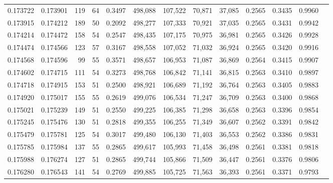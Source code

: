 \begin{tabular}{rrrrrrrrrrrrr}
0.173722 & 0.173901 &   119 &  64 &                                     0.3497 & 498,088 & 107,522 &  70,871 &  37,085 & 0.2565 & 0.3435 & 0.9960 \\
0.173915 & 0.174212 &   189 &  50 &                                     0.2092 & 498,277 & 107,333 &  70,921 &  37,035 & 0.2565 & 0.3431 & 0.9942 \\
0.174214 & 0.174472 &   158 &  54 &                                     0.2547 & 498,435 & 107,175 &  70,975 &  36,981 & 0.2565 & 0.3426 & 0.9928 \\
0.174474 & 0.174566 &   123 &  57 &                                     0.3167 & 498,558 & 107,052 &  71,032 &  36,924 & 0.2565 & 0.3420 & 0.9916 \\
0.174568 & 0.174596 &    99 &  55 &                                     0.3571 & 498,657 & 106,953 &  71,087 &  36,869 & 0.2564 & 0.3415 & 0.9907 \\
0.174602 & 0.174715 &   111 &  54 &                                     0.3273 & 498,768 & 106,842 &  71,141 &  36,815 & 0.2563 & 0.3410 & 0.9897 \\
0.174718 & 0.174915 &   153 &  51 &                                     0.2500 & 498,921 & 106,689 &  71,192 &  36,764 & 0.2563 & 0.3405 & 0.9883 \\
0.174920 & 0.175017 &   155 &  55 &                                     0.2619 & 499,076 & 106,534 &  71,247 &  36,709 & 0.2563 & 0.3400 & 0.9868 \\
0.175021 & 0.175239 &   149 &  51 &                                     0.2550 & 499,225 & 106,385 &  71,298 &  36,658 & 0.2563 & 0.3396 & 0.9854 \\
0.175245 & 0.175476 &   130 &  51 &                                     0.2818 & 499,355 & 106,255 &  71,349 &  36,607 & 0.2562 & 0.3391 & 0.9842 \\
0.175479 & 0.175781 &   125 &  54 &                                     0.3017 & 499,480 & 106,130 &  71,403 &  36,553 & 0.2562 & 0.3386 & 0.9831 \\
0.175785 & 0.175984 &   137 &  55 &                                     0.2865 & 499,617 & 105,993 &  71,458 &  36,498 & 0.2561 & 0.3381 & 0.9818 \\
0.175988 & 0.176274 &   127 &  51 &                                     0.2865 & 499,744 & 105,866 &  71,509 &  36,447 & 0.2561 & 0.3376 & 0.9806 \\
0.176280 & 0.176543 &   141 &  54 &                                     0.2769 & 499,885 & 105,725 &  71,563 &  36,393 & 0.2561 & 0.3371 & 0.9793 \\

\end{tabular}
